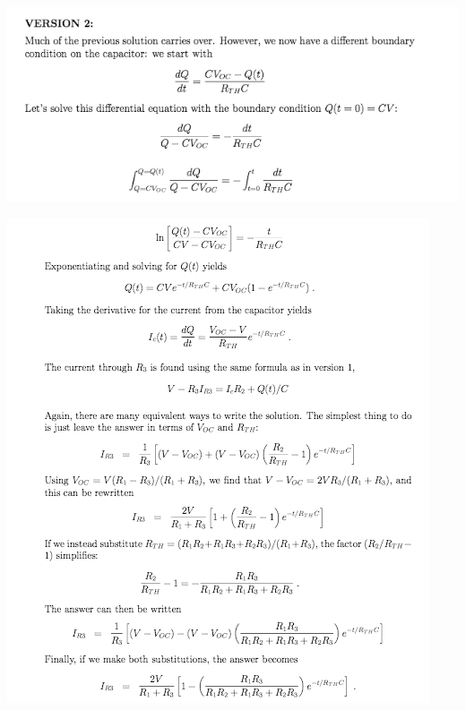 \documentclass[makesolutionspdf]{esg8022pset}
\begin{document}
\begin{solution}
  \begin{center}\includegraphics[width=\textwidth]{ps07_sol_07_4}\end{center}
  \begin{center}\includegraphics[width=\textwidth]{ps07_sol_07_5}\end{center}
\end{solution}
\end{document}
